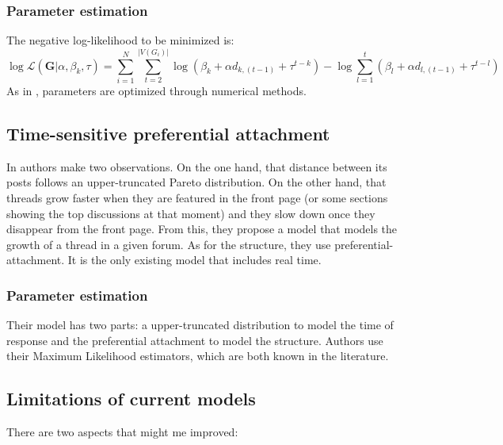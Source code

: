 \documentclass[smallextended]{svjour3}          %
\begin{document}
\subsubsection*{Parameter estimation}
The negative log-likelihood to be minimized is: 
\begin{equation}
\log \mathcal{L}(\mathbf{G} | \alpha, \beta_k, \tau)
=
\sum_{i=1}^{N}
\sum_{t=2}^{|V(G_i)|}
\log
\left(
\beta_k+
\alpha d_{k,(t-1)}
+ \tau^{t-k}
\right)
- \log
\sum_{l=1}^{t}
\left(\beta_l+
\alpha d_{l, (t-1)}
+ \tau^{t-l}
\right)
\end{equation}
As in \cite{Gomez2010}, parameters are optimized through numerical methods.



\subsection{Time-sensitive preferential attachment}
In \cite{Wang2012e} authors make two observations. On the one hand, that distance between its posts follows an upper-truncated Pareto distribution. On the other hand, that threads grow faster when they are featured in the front page (or some sections showing the top discussions at that moment) and they slow down once they disappear from the front page. From this, they propose a model that models the growth of a thread in a given forum. As for the structure, they use preferential-attachment. It is the only existing model that includes real time.

\subsubsection*{Parameter estimation}
Their model has two parts: a upper-truncated distribution to model the time of response and the preferential attachment to model the structure.
Authors use their Maximum Likelihood estimators, which are both known in the literature.

\subsection{Limitations of current models}
There are two aspects that might me improved:
\end{document}
